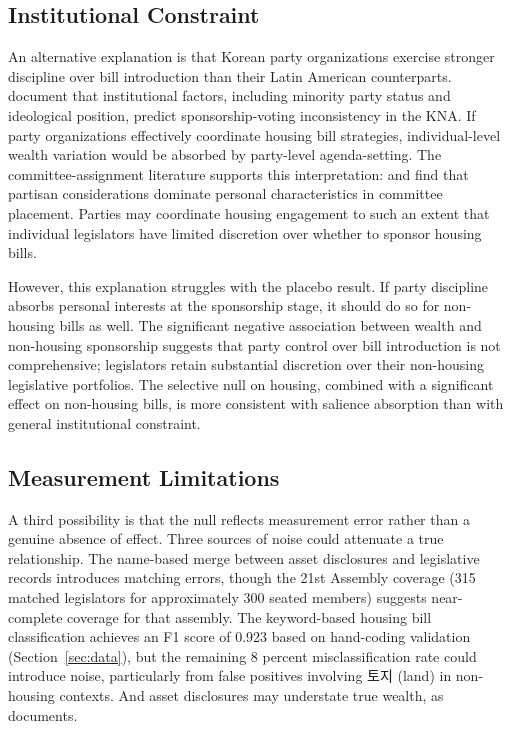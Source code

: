 \documentclass[11pt]{article}
\begin{document}
\subsection{Institutional Constraint}

An alternative explanation is that Korean party organizations exercise stronger discipline over bill introduction than their Latin American counterparts. \citet{kangpark2025} document that institutional factors, including minority party status and ideological position, predict sponsorship-voting inconsistency in the KNA. If party organizations effectively coordinate housing bill strategies, individual-level wealth variation would be absorbed by party-level agenda-setting. The committee-assignment literature supports this interpretation: \citet{kang2024} and \citet{choikoo2018} find that partisan considerations dominate personal characteristics in committee placement. Parties may coordinate housing engagement to such an extent that individual legislators have limited discretion over whether to sponsor housing bills.

However, this explanation struggles with the placebo result. If party discipline absorbs personal interests at the sponsorship stage, it should do so for non-housing bills as well. The significant negative association between wealth and non-housing sponsorship suggests that party control over bill introduction is not comprehensive; legislators retain substantial discretion over their non-housing legislative portfolios. The selective null on housing, combined with a significant effect on non-housing bills, is more consistent with salience absorption than with general institutional constraint.

\subsection{Measurement Limitations}

A third possibility is that the null reflects measurement error rather than a genuine absence of effect. Three sources of noise could attenuate a true relationship. The name-based merge between asset disclosures and legislative records introduces matching errors, though the 21st Assembly coverage (315 matched legislators for approximately 300 seated members) suggests near-complete coverage for that assembly. The keyword-based housing bill classification achieves an F1 score of 0.923 based on hand-coding validation (Section~\ref{sec:data}), but the remaining 8 percent misclassification rate could introduce noise, particularly from false positives involving 토지 (land) in non-housing contexts. And asset disclosures may understate true wealth, as \citet{jung2020} documents.
\end{document}
